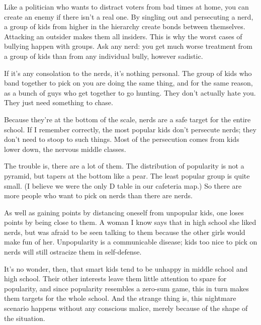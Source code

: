 Like a
                  politician who wants to distract voters from bad times at
                  home, you can create an enemy if there isn't a real one. By
                  singling out and persecuting a nerd, a group of kids from
                  higher in the hierarchy create bonds between themselves.
                  Attacking an outsider makes them all insiders. This is why the
                  worst cases of bullying happen with groups. Ask any nerd: you
                  get much worse treatment from a group of kids than from any
                  individual bully, however sadistic.

If it's any
                  consolation to the nerds, it's nothing personal. The group of
                  kids who band together to pick on you are doing the same
                  thing, and for the same reason, as a bunch of guys who get
                  together to go hunting. They don't actually hate you. They
                  just need something to chase.

Because they're at
                  the bottom of the scale, nerds are a safe target for the
                  entire school. If I remember correctly, the most popular kids
                  don't persecute nerds; they don't need to stoop to such
                  things. Most of the persecution comes from kids lower down,
                  the nervous middle classes.

The trouble is, there
                  are a lot of them. The distribution of popularity is not a
                  pyramid, but tapers at the bottom like a pear. The least
                  popular group is quite small. (I believe we were the only D
                  table in our cafeteria map.) So there are more people who want
                  to pick on nerds than there are nerds.

As well as
                  gaining points by distancing oneself from unpopular kids, one
                  loses points by being close to them. A woman I know says that
                  in high school she liked nerds, but was afraid to be seen
                  talking to them because the other girls would make fun of her.
                  Unpopularity is a communicable disease; kids too nice to pick
                  on nerds will still ostracize them in self-defense.

It's
                  no wonder, then, that smart kids tend to be unhappy in middle
                  school and high school. Their other interests leave them
                  little attention to spare for popularity, and since popularity
                  resembles a zero-sum game, this in turn makes them targets for
                  the whole school. And the strange thing is, this nightmare
                  scenario happens without any conscious malice, merely because
                  of the shape of the situation.




